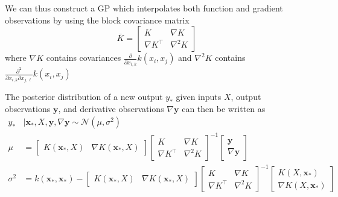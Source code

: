 \documentclass{article}
\newcommand{\mat}[1]{\begin{bmatrix}#1\end{bmatrix}}
\renewcommand{\vec}[1]{\mathbf{#1}}
\newcommand{\N}{\mathcal{N}}
\begin{document}
We can thus construct a GP which interpolates both function and gradient observations by using the block covariance matrix
$$ \bar{K} = \mat{K & \nabla K \\ \nabla K^\top & \nabla^2 K} $$
where $\nabla K$ contains covariances $\frac{\partial}{\partial x_{i,k}} k(x_i, x_j)$ and $\nabla^2 K$ contains $\frac{\partial^2}{\partial x_{i,k} \partial x_{j,\ell}} k(x_i, x_j)$

The posterior distribution of a new output $y_*$ given inputs $X$, output observations $\vec{y}$, and derivative observations $\nabla \vec{y}$ can then be written as
\begin{align*}
    y_* &| \vec{x}_*,X,\vec{y},\nabla\vec{y} \sim \N(\mu, \sigma^2) \\
    \mu & = \mat{K(\vec{x}_*, X) & \nabla K(\vec{x}_*, X)}
    \mat{K & \nabla K \\ \nabla K^\top & \nabla^2 K}^{-1}
    \mat{\vec{y} \\ \nabla \vec{y}} \\
    \sigma^2 & = k(\vec{x}_*, \vec{x}_*) - \mat{K(\vec{x}_*, X) & \nabla K(\vec{x}_*, X)}\mat{K & \nabla K \\ \nabla K^\top & \nabla^2 K}^{-1}\mat{K(X, \vec{x}_*) \\ \nabla K(X, \vec{x}_*)}
\end{align*}
\end{document}
